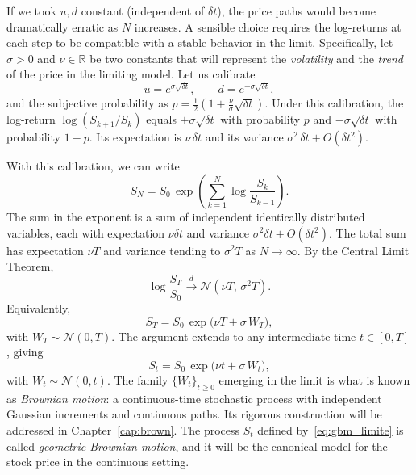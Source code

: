 \documentclass[11pt,a4paper,oneside]{report}
\theoremstyle{plain}
\theoremstyle{definition}
\theoremstyle{remark}
\newcommand{\R}{\mathbb{R}}
\newcommand{\1}{\mathbf{1}}
\begin{document}
If we took
$u, d$ constant (independent of $\delta t$), the price paths would
become dramatically erratic as $N$ increases. A sensible choice
requires the log-returns at each step to be compatible with a stable
behavior in the limit. Specifically, let $\sigma > 0$ and $\nu \in \R$
be two constants that will represent the \emph{volatility} and the
\emph{trend} of the price in the limiting model. Let us calibrate
\begin{equation}\label{eq:calibracion_ud}
  u = e^{\sigma \sqrt{\delta t}}, \qquad
  d = e^{-\sigma \sqrt{\delta t}},
\end{equation}
and the subjective probability as
$p = \tfrac{1}{2}(1 + \tfrac{\nu}{\sigma}\sqrt{\delta t})$. Under this
calibration, the log-return $\log(S_{k+1}/S_k)$ equals
$+\sigma\sqrt{\delta t}$ with probability $p$ and
$-\sigma\sqrt{\delta t}$ with probability $1-p$. Its expectation is
$\nu\, \delta t$ and its variance $\sigma^2\, \delta t + O(\delta t^2)$.

With this calibration, we can write
\begin{equation*}
  S_N = S_0\, \exp\!\left(\sum_{k=1}^{N} \log\frac{S_k}{S_{k-1}}\right).
\end{equation*}
The sum in the exponent is a sum of independent identically
distributed variables, each with expectation $\nu \delta t$ and
variance $\sigma^2 \delta t + O(\delta t^2)$. The total sum has
expectation $\nu T$ and variance tending to $\sigma^2 T$ as
$N \to \infty$. By the Central Limit Theorem,
\begin{equation*}
  \log\!\frac{S_T}{S_0} \xrightarrow{d} \mathcal{N}(\nu T,\, \sigma^2 T).
\end{equation*}
Equivalently,
\begin{equation}\label{eq:gbm_limite}
  S_T = S_0\, \exp\bigl(\nu T + \sigma\, W_T\bigr),
\end{equation}
with $W_T \sim \mathcal{N}(0, T)$. The argument extends to any
intermediate time $t \in [0, T]$, giving
\begin{equation*}
  S_t = S_0\, \exp\bigl(\nu t + \sigma\, W_t\bigr),
\end{equation*}
with $W_t \sim \mathcal{N}(0, t)$. The family $\{W_t\}_{t \geq 0}$
emerging in the limit is what is known as \emph{Brownian motion}: a
continuous-time stochastic process with independent Gaussian
increments and continuous paths. Its rigorous construction will be
addressed in Chapter~\ref{cap:brown}. The process $S_t$ defined
by~\eqref{eq:gbm_limite} is called \emph{geometric Brownian motion},
and it will be the canonical model for the stock price in the
continuous setting.
\end{document}
